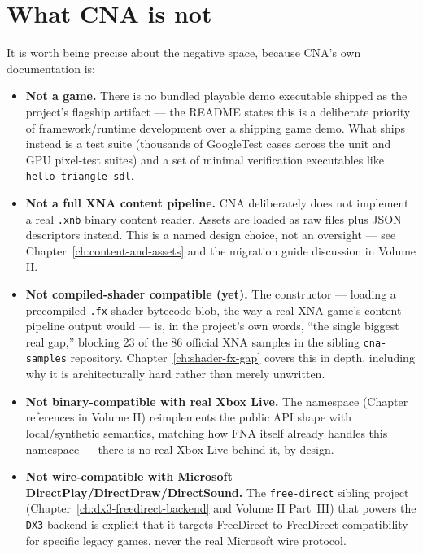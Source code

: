 \section{What CNA is not}

It is worth being precise about the negative space, because CNA's own documentation is:

\begin{itemize}
  \item \textbf{Not a game.} There is no bundled playable demo executable shipped as the
        project's flagship artifact --- the README states this is a deliberate priority of
        framework/runtime development over a shipping game demo. What ships instead is a
        test suite (thousands of GoogleTest cases across the unit and GPU pixel-test suites)
        and a set of minimal verification executables like \texttt{hello-triangle-sdl}.
  \item \textbf{Not a full XNA content pipeline.} CNA deliberately does not implement a real
        \texttt{.xnb} binary content reader. Assets are loaded as raw files plus JSON
        descriptors instead. This is a named design choice, not an oversight --- see
        Chapter~\ref{ch:content-and-assets} and the migration guide discussion in Volume II.
  \item \textbf{Not compiled-shader compatible (yet).} The  constructor --- loading a precompiled \texttt{.fx} shader bytecode blob, the
        way a real XNA game's content pipeline output would --- is, in the project's own
        words, ``the single biggest real gap,'' blocking 23 of the 86 official XNA samples in
        the sibling \texttt{cna-samples} repository. Chapter~\ref{ch:shader-fx-gap} covers
        this in depth, including why it is architecturally hard rather than merely unwritten.
  \item \textbf{Not binary-compatible with real Xbox Live.} The 
        namespace (Chapter references in Volume II) reimplements the public API shape with
        local/synthetic semantics, matching how FNA itself already handles this namespace ---
        there is no real Xbox Live behind it, by design.
  \item \textbf{Not wire-compatible with Microsoft DirectPlay/DirectDraw/DirectSound.} The
        \texttt{free-direct} sibling project (Chapter~\ref{ch:dx3-freedirect-backend} and
        Volume II Part~III) that powers the \texttt{DX3} backend is explicit that it targets
        FreeDirect-to-FreeDirect compatibility for specific legacy games, never the real
        Microsoft wire protocol.
\end{itemize}

